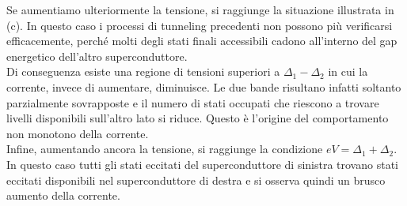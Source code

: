 Se aumentiamo ulteriormente la tensione, si raggiunge la situazione illustrata in (c). In questo caso i processi di tunneling precedenti non possono più verificarsi efficacemente, perché molti degli stati finali accessibili cadono all'interno del gap energetico dell'altro superconduttore.\\
Di conseguenza esiste una regione di tensioni superiori a $\Delta_1-\Delta_2$ in cui la corrente, invece di aumentare, diminuisce. Le due bande risultano infatti soltanto parzialmente sovrapposte e il numero di stati occupati che riescono a trovare livelli disponibili sull'altro lato si riduce. Questo è l'origine del comportamento non monotono della corrente.\\
Infine, aumentando ancora la tensione, si raggiunge la condizione $eV=\Delta_1+\Delta_2$. In questo caso tutti gli stati eccitati del superconduttore di sinistra trovano stati eccitati disponibili nel superconduttore di destra e si osserva quindi un brusco aumento della corrente.
